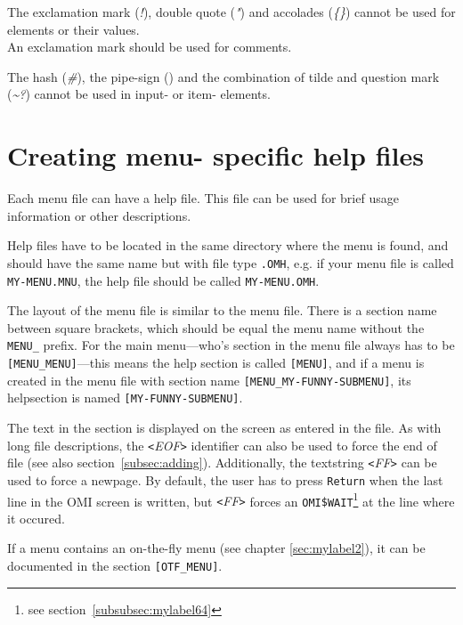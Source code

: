 \documentclass[a4paper]{book}
\newcommand{\vs}{\vspace{3mm}}
\newcommand{\lt}{\texttt{<}}
\newcommand{\gt}{\texttt{>}}
\begin{document}
\vs

The exclamation mark (\textsl{!}), double quote (\textsl{"}) and accolades (\textsl{{\{}{\}}}) cannot 
be used for elements or their values. \\
An exclamation mark should be used for comments.

\vs

The hash (\textsl{{\#}}), the pipe-sign (\textsl{\textbar}) and the combination of tilde and 
question mark (\textsl{\~{}?}) cannot be used in input- or item- elements.

\section{Creating menu- specific help files}\label{sec:mnhelp}

Each menu file can have a help file. This file can be used for brief usage information
or other descriptions.

Help files have to be located in the same directory where the menu is found, and should
have the same name but with file type \texttt{.OMH}, e.g. if your menu file is
called \texttt{MY-MENU.MNU}, the help file should be called \texttt{MY-MENU.OMH}.

\vs

The layout of the menu file is similar to the menu file. There is a section name
between square brackets, which should be equal the menu name without the \texttt{MENU\_} prefix.
For the main menu---who's section in the menu file always has to be \texttt{[MENU\_MENU]}---this
means the help section is called \texttt{[MENU]}, and if a menu is created in the menu file
with section name \texttt{[MENU\_MY-FUNNY-SUBMENU]}, its helpsection is named \texttt{[MY-FUNNY-SUBMENU]}.

\vs

The text in the section is displayed on the screen as entered in the file.
As with long file descriptions, the \textsl{\lt EOF\gt} identifier
can also be used to force the end of file (see also section~\ref{subsec:adding}).
Additionally, the textstring \textsl{\lt FF\gt} can be used to force
a newpage. By default, the user has to press \texttt{Return} when the last line
in the OMI screen is written, but \textsl{\lt FF\gt} forces an \texttt{OMI{\$}WAIT}\footnote{ see section~\ref{subsubsec:mylabel64}}
at the line where it occured.

\vs

If a menu contains an on-the-fly menu (see chapter \ref{sec:mylabel2}), it can be documented in the section \texttt{[OTF{\_}MENU]}.
\end{document}
